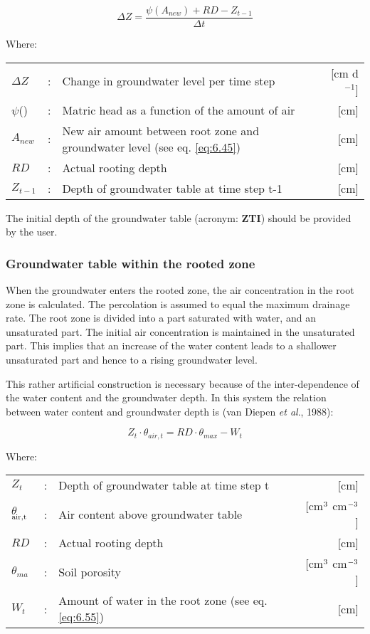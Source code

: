 \begin{equation}
\label{eq:6.48}
\Delta Z = {\frac{\psi (A_{new} ) + RD - Z_{t-1}}{\Delta t}}
\end{equation}

Where:\\[5pt]
\begin{tabularx}{\textwidth}{llXr}
$\Delta Z$ &:& Change in groundwater level per time step  & [cm d$^{ -1}$]\\
$\psi$() &:& Matric head as a function of the amount of air  & [cm]\\
$A_{new}$ &:& New air amount between root zone and groundwater
   level (see eq. \ref{eq:6.45})  & [cm]\\
$RD$ &:& Actual rooting depth  & [cm]\\
$Z_{t-1}$ &:& Depth of groundwater table at time step t-1  & [cm]
\end{tabularx}

The initial depth of the groundwater table (acronym: {\bf ZTI}) should be provided by the
user. 

\subsubsection{Groundwater table within the rooted zone}
When the groundwater enters the rooted zone, the air concentration in the root zone is
calculated. The percolation is assumed to equal the maximum drainage rate. The root
zone is divided into a part saturated with water, and an unsaturated part. The initial air
concentration is maintained in the unsaturated part. This implies that an increase of the
water content leads to a shallower unsaturated part and hence to a rising groundwater
level.

This rather artificial construction is necessary because of the inter-dependence of the
water content and the groundwater depth. In this system the relation between water
content and groundwater depth is (van Diepen {\it et al}., 1988):

\begin{equation}
\label{eq:6.49}
Z_{t} \cdot \theta_{air,t} = RD \cdot \theta_{max} - W_{t} 
\end{equation}

Where:\\[5pt]
\begin{tabularx}{\textwidth}{llXr}
$Z_{t}$ &:& Depth of groundwater table at time step t  & [cm]\\
$\theta$$_{{\rm air,t}}$ &:& Air content above groundwater table  
    & [cm$^{{\rm 3}}$ cm$^{{\rm -3}}$]\\
$RD$ &:& Actual rooting depth  & [cm]\\
$\theta_{ma}$ &:& Soil porosity  & [cm$^{{\rm 3}}$ cm$^{{\rm -3}}$]\\
$W_{ t}$ &:& Amount of water in the root zone (see eq. \ref{eq:6.55})  & [cm]\\
\end{tabularx}

